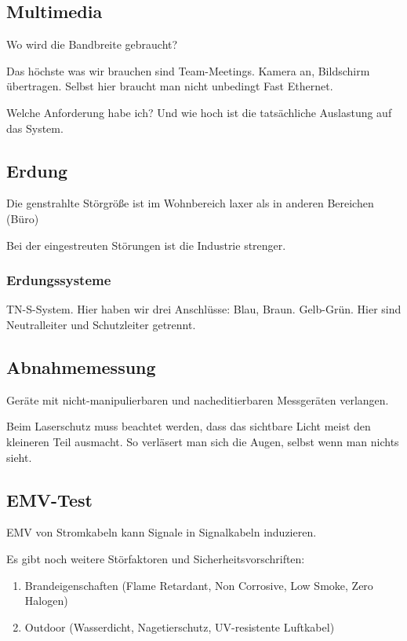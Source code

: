 \documentclass[a4paper]{article}
\begin{document}
\subsection{Multimedia}

Wo wird die Bandbreite gebraucht?

Das höchste was wir brauchen sind Team-Meetings. Kamera an, Bildschirm übertragen. Selbst hier braucht man nicht unbedingt Fast Ethernet.

Welche Anforderung habe ich? Und wie hoch ist die tatsächliche Auslastung auf das System.

\subsection{Erdung}


Die genstrahlte Störgröße ist im Wohnbereich laxer als in anderen Bereichen (Büro)

Bei der eingestreuten Störungen ist die Industrie strenger.

\subsubsection*{Erdungssysteme}

TN-S-System. Hier haben wir drei Anschlüsse: Blau, Braun. Gelb-Grün.  Hier sind Neutralleiter und Schutzleiter getrennt.


\subsection{Abnahmemessung}

Geräte mit nicht-manipulierbaren und nacheditierbaren Messgeräten verlangen.

Beim Laserschutz muss beachtet werden, dass das sichtbare Licht meist den kleineren Teil ausmacht. So verläsert man sich die Augen, selbst wenn man nichts sieht.

\subsection{EMV-Test}

EMV von Stromkabeln kann Signale in Signalkabeln induzieren.

Es gibt noch weitere Störfaktoren und Sicherheitsvorschriften:

\begin{enumerate}
    \item Brandeigenschaften (Flame Retardant, Non Corrosive, Low Smoke, Zero Halogen)
    \item Outdoor (Wasserdicht, Nagetierschutz, UV-resistente Luftkabel)
\end{enumerate}
\end{document}
